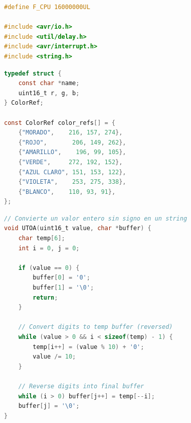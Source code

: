 














\begin{lstlisting}[language=C, caption={Librerias utilizadas}]
#define F_CPU 16000000UL

#include <avr/io.h>
#include <util/delay.h>
#include <avr/interrupt.h>
#include <string.h>
\end{lstlisting}

\begin{lstlisting}[language=C, caption={Mapeado de colores}]
typedef struct {
	const char *name;
	uint16_t r, g, b;
} ColorRef;

const ColorRef color_refs[] = {
	{"MORADO",    216, 157, 274},
	{"ROJO",       206, 149, 262},
	{"AMARILLO",    196, 99, 105},
	{"VERDE",     272, 192, 152},
	{"AZUL CLARO", 151, 153, 122},
	{"VIOLETA",    253, 275, 338},
	{"BLANCO",    110, 93, 91},
};
\end{lstlisting}

\begin{lstlisting}[language=C, caption={Convertidor de unsigned integer a string}]
// Convierte un valor entero sin signo en un string
void UTOA(uint16_t value, char *buffer) { 
	char temp[6];
	int i = 0, j = 0;

	if (value == 0) {
		buffer[0] = '0';
		buffer[1] = '\0';
		return;
	}

	// Convert digits to temp buffer (reversed)
	while (value > 0 && i < sizeof(temp) - 1) {
		temp[i++] = (value % 10) + '0';
		value /= 10;
	}

	// Reverse digits into final buffer
	while (i > 0) buffer[j++] = temp[--i];
	buffer[j] = '\0';
}
\end{lstlisting}

